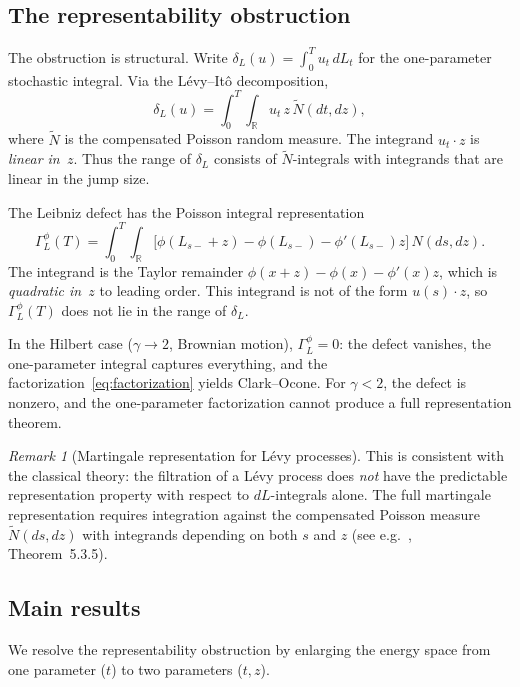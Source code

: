 \documentclass[11pt,a4paper]{article}
\theoremstyle{plain}
\theoremstyle{definition}
\theoremstyle{remark}
\newtheorem{remark}[theorem]{Remark}
\newcommand{\R}{\mathbb{R}}
\begin{document}
\subsection{The representability obstruction}\label{sec:obstruction}

The obstruction is structural.  Write
$\delta_L(u) = \int_0^T u_t\,dL_t$ for the one-parameter
stochastic integral.  Via the L\'evy--It\^o decomposition,
\[
  \delta_L(u)
  = \int_0^T\!\!\int_{\R} u_t\,z\,\widetilde{N}(dt,dz),
\]
where $\widetilde{N}$ is the compensated Poisson random measure.
The integrand $u_t \cdot z$ is \emph{linear in~$z$}.  Thus the
range of $\delta_L$ consists of $\widetilde{N}$-integrals with
integrands that are linear in the jump size.

The Leibniz defect has the Poisson integral representation
\begin{equation}\label{eq:defect-poisson}
  \Gamma_L^{\phi}(T)
  = \int_0^T\!\!\int_{\R}
  \bigl[\phi(L_{s-}+z) - \phi(L_{s-}) - \phi'(L_{s-})z\bigr]\,
  N(ds,dz).
\end{equation}
The integrand is the Taylor remainder
$\phi(x+z) - \phi(x) - \phi'(x)z$, which is
\emph{quadratic in~$z$} to leading order.  This integrand
is not of the form $u(s)\cdot z$, so $\Gamma_L^{\phi}(T)$ does
not lie in the range of $\delta_L$.

In the Hilbert case ($\gamma \to 2$, Brownian motion),
$\Gamma_L^{\phi} = 0$: the defect vanishes, the
one-parameter integral captures everything, and the
factorization~\eqref{eq:factorization} yields Clark--Ocone.
For $\gamma < 2$, the defect is nonzero, and the one-parameter
factorization cannot produce a full representation theorem.

\begin{remark}[Martingale representation for L\'evy processes]
\label{rem:levy-rep}
This is consistent with the classical theory: the filtration of
a L\'evy process does \emph{not} have the predictable
representation property with respect to $dL$-integrals alone.
The full martingale representation requires integration against
the compensated Poisson measure $\widetilde{N}(ds,dz)$ with
integrands depending on both $s$ and $z$
(see e.g.~\cite{Applebaum2009}, Theorem~5.3.5).
\end{remark}


\subsection{Main results}

We resolve the representability obstruction by enlarging the
energy space from one parameter ($t$) to two parameters ($t,z$).
\end{document}
